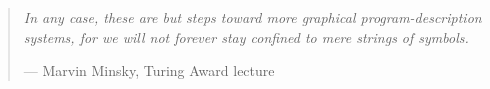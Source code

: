 \documentclass[preprint,9pt]{sigplanconf}
\begin{document}

\begin{quote}
\emph{In any case, these are but steps toward more graphical program-description
systems, for we will not forever stay confined to mere strings of symbols.}

--- Marvin Minsky, Turing Award lecture \cite{DBLP:journals/jacm/Minsky70}
\end{quote}

\clearpage




\iftr
\clearpage
\appendix

\else
\fi
\end{document}

